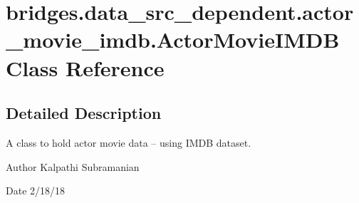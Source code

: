 \hypertarget{classbridges_1_1data__src__dependent_1_1actor__movie__imdb_1_1_actor_movie_i_m_d_b}{}\section{bridges.\+data\+\_\+src\+\_\+dependent.\+actor\+\_\+movie\+\_\+imdb.\+Actor\+Movie\+I\+M\+DB Class Reference}
\label{classbridges_1_1data__src__dependent_1_1actor__movie__imdb_1_1_actor_movie_i_m_d_b}


\subsection{Detailed Description}
A class to hold actor movie data -- using I\+M\+DB dataset. 

\begin{DoxyAuthor}{Author}
Kalpathi Subramanian 
\end{DoxyAuthor}
\begin{DoxyDate}{Date}
2/18/18 
\end{DoxyDate}
